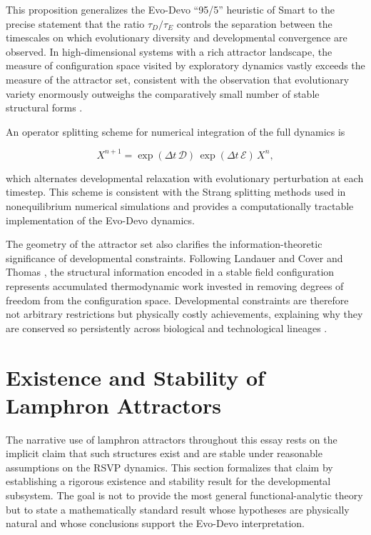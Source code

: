 \documentclass[12pt]{article}
\begin{document}
This proposition generalizes the Evo-Devo ``95/5'' heuristic of Smart \cite{smart2009} to the precise statement that the ratio $\tau_D / \tau_E$ controls the separation between the timescales on which evolutionary diversity and developmental convergence are observed. In high-dimensional systems with a rich attractor landscape, the measure of configuration space visited by exploratory dynamics vastly exceeds the measure of the attractor set, consistent with the observation that evolutionary variety enormously outweighs the comparatively small number of stable structural forms \cite{kauffman1993,gellmann1994}.

An operator splitting scheme for numerical integration of the full dynamics is

\begin{equation}
X^{n+1} = \exp(\Delta t \,\mathcal{D})\,\exp(\Delta t \,\mathcal{E})\,X^n,
\label{eq:splitting}
\end{equation}

which alternates developmental relaxation with evolutionary perturbation at each timestep. This scheme is consistent with the Strang splitting methods used in nonequilibrium numerical simulations \cite{strogatz1994} and provides a computationally tractable implementation of the Evo-Devo dynamics.

The geometry of the attractor set also clarifies the information-theoretic significance of developmental constraints. Following Landauer \cite{landauer1961} and Cover and Thomas \cite{cover2006}, the structural information encoded in a stable field configuration represents accumulated thermodynamic work invested in removing degrees of freedom from the configuration space. Developmental constraints are therefore not arbitrary restrictions but physically costly achievements, explaining why they are conserved so persistently across biological and technological lineages \cite{kauffman1993,thompson1917}.

\section{Existence and Stability of Lamphron Attractors}
\label{sec:lamphron_theorem}

The narrative use of lamphron attractors throughout this essay rests on the implicit claim that such structures exist and are stable under reasonable assumptions on the RSVP dynamics. This section formalizes that claim by establishing a rigorous existence and stability result for the developmental subsystem. The goal is not to provide the most general functional-analytic theory but to state a mathematically standard result whose hypotheses are physically natural and whose conclusions support the Evo-Devo interpretation.
\end{document}
